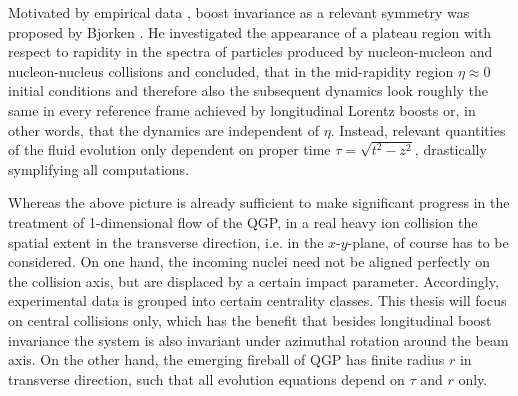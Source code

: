 Motivated by empirical data \cite{AlpgardEtAl_1981}, boost invariance as a relevant symmetry was proposed by Bjorken \cite{Bjorken_1983}. He investigated the appearance of a plateau region with respect to rapidity in the spectra of particles produced by nucleon-nucleon and nucleon-nucleus collisions and concluded, that in the mid-rapidity region ${\eta\approx 0}$ initial conditions and therefore also the subsequent dynamics look roughly the same in every reference frame achieved by longitudinal Lorentz boosts or, in other words, that the dynamics are independent of $\eta$. Instead, relevant quantities of the fluid evolution only dependent on proper time ${\tau=\sqrt{t^2-z^2}}$, drastically symplifying all computations.

Whereas the above picture is already sufficient to make significant progress in the treatment of 1-dimensional flow of the QGP, in a real heavy ion collision the spatial extent in the transverse direction, i.e. in the $x$-$y$-plane, of course has to be considered. On one hand, the incoming nuclei need not be aligned perfectly on the collision axis, but are displaced by a certain impact parameter. Accordingly, experimental data is grouped into certain centrality classes. This thesis will focus on central collisions only, which has the benefit that besides longitudinal boost invariance the system is also invariant under azimuthal rotation around the beam axis. On the other hand, the emerging fireball of QGP has finite radius $r$ in transverse direction, such that all evolution equations depend on $\tau$ and $r$ only.

